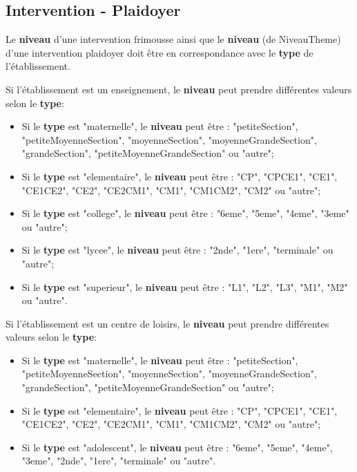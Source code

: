 \documentclass[asi, sansVersion]{picInsa}
\begin{document}
\subsection*{Intervention - Plaidoyer}
Le \textbf{niveau} d'une intervention frimousse ainsi que le \textbf{niveau} (de NiveauTheme) d'une intervention plaidoyer doit être en correspondance avec le \textbf{type} de l'établissement.  

Si l'établissement est un enseignement, le \textbf{niveau} peut prendre différentes valeurs selon le \textbf{type}:
\begin{itemize}
\item Si le \textbf{type} est "maternelle", le \textbf{niveau} peut être : "petiteSection", "petiteMoyenneSection", "moyenneSection", "moyenneGrandeSection", "grandeSection", "petiteMoyenneGrandeSection" ou "autre";
\item Si le \textbf{type} est "elementaire", le \textbf{niveau} peut être : "CP", "CPCE1", "CE1", "CE1CE2", "CE2", "CE2CM1", "CM1", "CM1CM2", "CM2" ou "autre";
\item Si le \textbf{type} est "college", le \textbf{niveau} peut être : "6eme", "5eme", "4eme", "3eme" ou "autre";
\item Si le \textbf{type} est "lycee", le \textbf{niveau} peut être : "2nde", "1ere", "terminale" ou "autre";
\item Si le \textbf{type} est "superieur", le \textbf{niveau} peut être : "L1", "L2", "L3", "M1", "M2" ou "autre".
\end{itemize}

Si l'établissement est un centre de loisirs, le \textbf{niveau} peut prendre différentes valeurs selon le \textbf{type}:
\begin{itemize}
\item Si le \textbf{type} est "maternelle", le \textbf{niveau} peut être : "petiteSection", "petiteMoyenneSection", "moyenneSection", "moyenneGrandeSection", "grandeSection", "petiteMoyenneGrandeSection" ou "autre";
\item Si le \textbf{type} est "elementaire", le \textbf{niveau} peut être : "CP", "CPCE1", "CE1", "CE1CE2", "CE2", "CE2CM1", "CM1", "CM1CM2", "CM2" ou "autre";
\item Si le \textbf{type} est "adolescent", le \textbf{niveau} peut être : "6eme", "5eme", "4eme", "3eme", "2nde", "1ere", "terminale" ou "autre".
\end{itemize}
\end{document}
